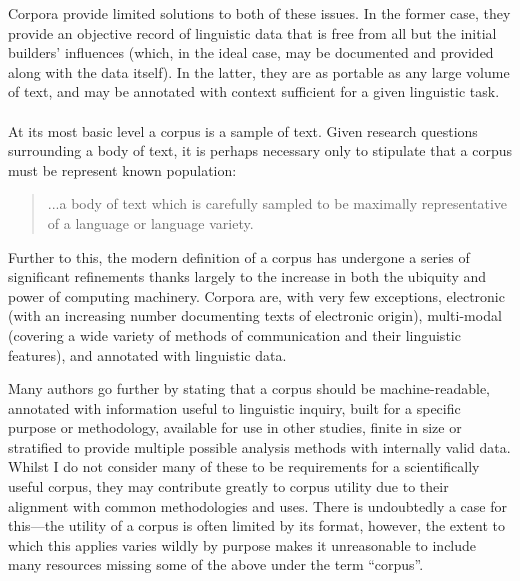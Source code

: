 Corpora provide limited solutions to both of these issues.  In the former case, they provide an objective record of linguistic data that is free from all but the initial builders' influences (which, in the ideal case, may be documented and provided along with the data itself).  In the latter, they are as portable as any large volume of text, and may be annotated with context sufficient for a given linguistic task.


\paragraph{}
At its most basic level a corpus is a sample of text.  Given research questions surrounding a body of text, it is perhaps necessary only to stipulate that a corpus must be represent known population\cite[p. 22]{mcenery2001corpus}:

\begin{quote}
...a body of text which is carefully sampled to be maximally representative of a language or language variety.
\end{quote}

Further to this, the modern definition of a corpus has undergone a series of significant refinements thanks largely to the increase in both the ubiquity and power of computing machinery.  Corpora are, with very few exceptions, electronic (with an increasing number documenting texts of electronic origin), multi-modal (covering a wide variety of methods of communication and their linguistic features), and annotated with linguistic data.

Many authors go further by stating that a corpus should be machine-readable, annotated with information useful to linguistic inquiry, built for a specific purpose or methodology, available for use in other studies, finite in size or stratified to provide multiple possible analysis methods with internally valid data\cite{bennett2010using,bowker2002working,leech1992corpora}.
Whilst I do not consider many of these to be requirements for a scientifically useful corpus, they may contribute greatly to corpus utility due to their alignment with common methodologies and uses.  There is undoubtedly a case for this---the utility of a corpus is often limited by its format, however, the extent to which this applies varies wildly by purpose makes it unreasonable to include many resources missing some of the above under the term ``corpus''.


